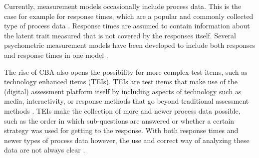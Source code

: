 \documentclass{interact}
\begin{document}
Currently, measurement models occasionally include process data. This is the case for example for response times, which are a popular and commonly collected type of process data \parencite{molenaar2015generalized}. Response times are assumed to contain information about the latent trait measured that is not covered by the responses itself. Several psychometric measurement models have been developed to include both responses and response times in one model \parencite{molenaar2015generalized, van2007hierarchical, entink2009statistical}.

The rise of CBA also opens the possibility for more complex test items, such as technology enhanced items (TEIs). TEIs are test items that make use of the (digital) assessment platform itself by including aspects of technology such as media, interactivity, or response methods that go beyond traditional assessment methods \parencite{Commissionguide, bryant2017developing}. TEIs make the collection of more and newer process data possible, such as the order in which sub-questions are answered or whether a certain strategy was used for getting to the response. With both response times and newer types of process data however, the use and correct way of analyzing these data are not always clear \parencite{qiao2018data, von2019developments, tang2021exploratory}. 
\end{document}
